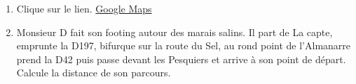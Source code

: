 

\begin{enumerate}
\item Clique sur le lien. \href{https://www.google.com/maps/place/Cart\%C3\%A9,+65270,+France/@43.0427519,6.2348953,12.29z/data=!4m5!3m4!1s0xd57cdc9541a448b:0x8f62403cc90fc436!8m2!3d43.11184!4d-0.182035}{Google Maps}
\item Monsieur D fait son footing autour des marais salins. Il part de La capte, emprunte la D197, bifurque sur la route du Sel, au rond point de l'Almanarre prend la D42 puis passe devant les Pesquiers et arrive à son point de départ. Calcule la distance de son parcours.
\end{enumerate}